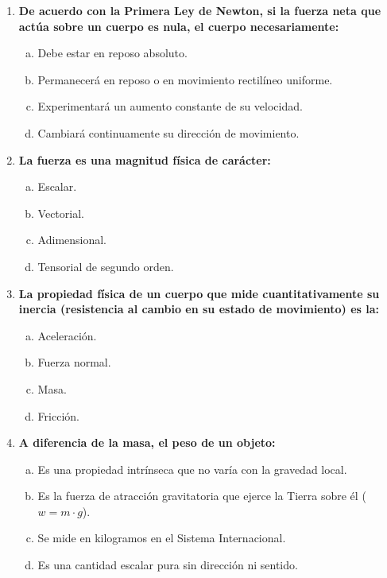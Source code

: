 \documentclass[11pt,a4paper]{article}
\begin{document}
\begin{enumerate}
    \item \textbf{De acuerdo con la Primera Ley de Newton, si la fuerza neta que actúa sobre un cuerpo es nula, el cuerpo necesariamente:}
    \begin{enumerate}[a)]
        \item Debe estar en reposo absoluto.
        \item Permanecerá en reposo o en movimiento rectilíneo uniforme.
        \item Experimentará un aumento constante de su velocidad.
        \item Cambiará continuamente su dirección de movimiento.
    \end{enumerate}

    \item \textbf{La fuerza es una magnitud física de carácter:}
    \begin{enumerate}[a)]
        \item Escalar.
        \item Vectorial.
        \item Adimensional.
        \item Tensorial de segundo orden.
    \end{enumerate}

    \item \textbf{La propiedad física de un cuerpo que mide cuantitativamente su inercia (resistencia al cambio en su estado de movimiento) es la:}
    \begin{enumerate}[a)]
        \item Aceleración.
        \item Fuerza normal.
        \item Masa.
        \item Fricción.
    \end{enumerate}

    \item \textbf{A diferencia de la masa, el peso de un objeto:}
    \begin{enumerate}[a)]
        \item Es una propiedad intrínseca que no varía con la gravedad local.
        \item Es la fuerza de atracción gravitatoria que ejerce la Tierra sobre él ($w = m \cdot g$).
        \item Se mide en kilogramos en el Sistema Internacional.
        \item Es una cantidad escalar pura sin dirección ni sentido.
    \end{enumerate}


\end{enumerate}
\end{document}
